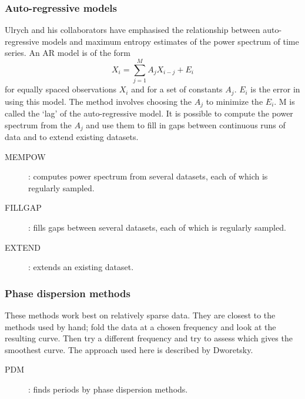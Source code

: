 \subsubsection {Auto-regressive models}
Ulrych and his collaborators have emphasised the relationship between
auto-regressive models and maximum entropy estimates of the power spectrum of
time series.
An AR model is of the form
\begin{equation}
X_{i}=\sum_{j=1}^{M} A_{j}X_{i-j}+E_{i}
\end{equation}
for equally spaced observations $X_{i}$ and for a set of constants $A_{j}$.
$E_{i}$ is the error in using this model.
The method involves choosing the $A_{j}$ to minimize the $E_{i}$.
M is called the `lag' of the auto-regressive model.
It is possible to compute the power spectrum from the $A_{j}$ and use them to
fill in gaps between continuous runs of data and to extend existing datasets.
\begin{description}
\begin{description}
\item [MEMPOW]: computes power spectrum from several datasets, each of which is
regularly sampled.
\item [FILLGAP]: fills gaps between several datasets, each of which is
regularly sampled.
\item [EXTEND]: extends an existing dataset.
\end{description}
\end{description}
\subsubsection {Phase dispersion methods}
These methods work best on relatively sparse data.
They are closest to the methods used by hand; fold the data at a chosen
frequency and look at the resulting curve.
Then try a different frequency and try to assess which gives the smoothest
curve.
The approach used here is described by Dworetsky.
\begin{description}
\begin{description}
\item [PDM]: finds periods by phase dispersion methods.
\end{description}
\end{description}
